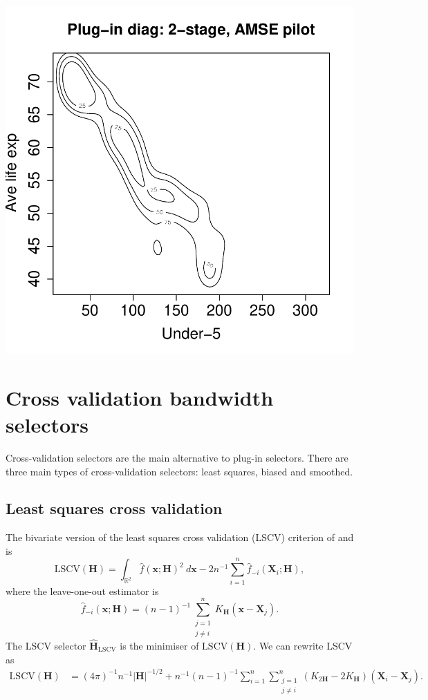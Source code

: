 \documentclass[a4paper,11pt]{article}
\renewcommand{\vec}[1]{\boldsymbol{#1}}
\newcommand{\mat}[1]{\mathbf{#1}}
\def\jneqi{\substack{j=1 \\ j\neq i}}
\def\HH{\mat{H}}
\def\LSCV{\mathrm{LSCV}}
\def\vecx{\vec{x}}
\def\intr2{\int_{\boldsymbol{\mathbb{R}}^2}}
\begin{document}
\begin{center}
\includegraphics{kde-008}
\end{center}


\section{Cross validation bandwidth selectors}

Cross-validation selectors are the main alternative to plug-in selectors.
There are three main types of cross-validation selectors: 
least squares, biased and smoothed. 

\subsection{Least squares cross validation}
\label{sec:lscv}
The bivariate version of 
the least squares cross validation (LSCV) criterion of
\citet*{rudemo82} and \citet*{bowman84} is 
$$\LSCV (\HH) = \intr2 \hat{f}(\vec{x}; \HH)^2 \ d \vecx - 2n^{-1} \sum_{i=1}^n 
\hat{f}_{-i} (\vec{X}_i; \HH),$$
where the leave-one-out estimator is 
$$\hat{f}_{-i} (\vec{x}; \HH) = (n-1)^{-1} 
\sum_{\jneqi}^n K_\HH (\vec{x} - \vec{X}_j).$$ 
The LSCV selector $\hat{\HH}_\LSCV$ 
is the minimiser of $\LSCV(\HH)$. We can rewrite LSCV as
\begin{align}
\label{eq:lscv2}
\LSCV(\HH) & = (4\pi)^{-1} n^{-1} |\HH|^{-1/2} + n^{-1} (n-1)^{-1} 
\sum_{i=1}^n \sum_{\jneqi}^n 
(K_{2\HH} - 2K_\HH) (\vec{X}_i - \vec{X}_j). 
\end{align}
\end{document}
